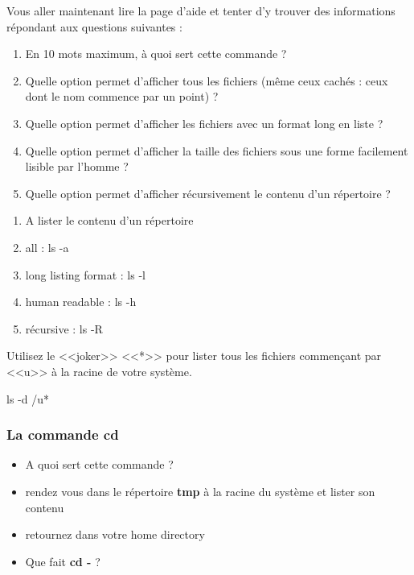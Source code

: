 \documentclass[11pt]{article}
\begin{document}
Vous aller maintenant lire la page d’aide et tenter d'y trouver des informations répondant aux questions suivantes :

\begin{enumerate}
 \item En 10 mots maximum, à quoi sert cette commande ?
 \item Quelle option permet d’afficher tous les fichiers (même ceux cachés : ceux dont le nom commence par un point) ?
 \item Quelle option permet d’afficher les fichiers avec un format long en liste ?
 \item Quelle option permet d’afficher la taille des fichiers sous une forme facilement lisible par l’homme ?
 \item Quelle option permet d’afficher récursivement le contenu d'un répertoire ?
\end{enumerate}

\begin{solution}
 \begin{enumerate}
  \item A lister le contenu d'un répertoire
  \item all : ls -a
  \item long listing format : ls -l
  \item human readable : ls -h
  \item récursive : ls -R
 \end{enumerate}
\end{solution}

Utilisez le <<joker>> <<*>> pour lister tous les fichiers commençant par <<u>> à la racine de votre système.

\begin{solution}
ls -d /u*
\end{solution}

\subsubsection{La commande \textbf{cd}}

\begin{itemize}
 \item A quoi sert cette commande ?
 \item rendez vous dans le répertoire \textbf{tmp} à la racine du système et lister son contenu
 \item retournez dans votre home directory
 \item Que fait \textbf{cd -} ?
\end{itemize}
\end{document}
